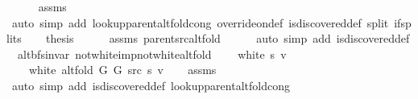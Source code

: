 \begin{isabellebody}
\ \ \ \ \isamarkupfalse%
\ assms\isanewline
\ \ \ \ \isamarkupfalse%
\ {\isacharparenleft}{\kern0pt}auto\ simp\ add{\isacharcolon}{\kern0pt}\ lookup{\isacharunderscore}{\kern0pt}parent{\isacharunderscore}{\kern0pt}alt{\isacharunderscore}{\kern0pt}fold{\isacharunderscore}{\kern0pt}cong\ override{\isacharunderscore}{\kern0pt}on{\isacharunderscore}{\kern0pt}def\ is{\isacharunderscore}{\kern0pt}discovered{\isacharunderscore}{\kern0pt}def\ split{\isacharcolon}{\kern0pt}\ if{\isacharunderscore}{\kern0pt}splits{\isacharparenleft}{\kern0pt}{}{\isacharparenright}{\kern0pt}{\isacharparenright}{\kern0pt}\isanewline
\ \ \isamarkupfalse%
\ {\isacharquery}{\kern0pt}thesis\isanewline
\ \ \ \ \isamarkupfalse%
\ assms{\isacharparenleft}{\kern0pt}{}{\isacharparenright}{\kern0pt}\ parent{\isacharunderscore}{\kern0pt}src{\isacharunderscore}{\kern0pt}alt{\isacharunderscore}{\kern0pt}fold\isanewline
\ \ \ \ \isamarkupfalse%
\ {\isacharparenleft}{\kern0pt}auto\ simp\ add{\isacharcolon}{\kern0pt}\ is{\isacharunderscore}{\kern0pt}discovered{\isacharunderscore}{\kern0pt}def{\isacharparenright}{\kern0pt}\isanewline
{}\isamarkupfalse%
%
\endisatagproof
{\isafoldproof}%
%
\isadelimproof
\isanewline
%
\endisadelimproof
\isanewline
{}\isamarkupfalse%
\ {\isacharparenleft}{\kern0pt}\ alt{\isacharunderscore}{\kern0pt}bfs{\isacharunderscore}{\kern0pt}invar{\isacharparenright}{\kern0pt}\ not{\isacharunderscore}{\kern0pt}white{\isacharunderscore}{\kern0pt}imp{\isacharunderscore}{\kern0pt}not{\isacharunderscore}{\kern0pt}white{\isacharunderscore}{\kern0pt}alt{\isacharunderscore}{\kern0pt}fold{\isacharcolon}{\kern0pt}\isanewline
\ \ \ {\isachardoublequoteopen}{\isasymnot}\ white\ s\ v{\isachardoublequoteclose}\isanewline
\ \ \ {\isachardoublequoteopen}{\isasymnot}\ white\ {\isacharparenleft}{\kern0pt}alt{\isacharunderscore}{\kern0pt}fold\ G{}\ G{}\ src\ s{\isacharparenright}{\kern0pt}\ v{\isachardoublequoteclose}\isanewline
%
\isadelimproof
\ \ %
\endisadelimproof
%
\isatagproof
{}\isamarkupfalse%
\ assms\isanewline
\ \ \isamarkupfalse%
\ {\isacharparenleft}{\kern0pt}auto\ simp\ add{\isacharcolon}{\kern0pt}\ is{\isacharunderscore}{\kern0pt}discovered{\isacharunderscore}{\kern0pt}def\ lookup{\isacharunderscore}{\kern0pt}parent{\isacharunderscore}{\kern0pt}alt{\isacharunderscore}{\kern0pt}fold{\isacharunderscore}{\kern0pt}cong{\isacharparenright}{\kern0pt}%

\end{isabellebody}

